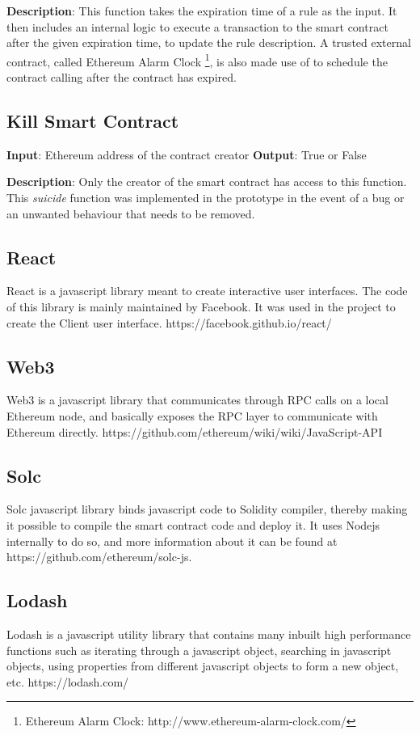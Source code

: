 \documentclass[english]{tktltiki}
\begin{document}
\textbf{Description}: This function takes the expiration time of a rule as the input. It then includes an internal logic to execute a transaction to the smart contract after the given expiration time, to update the rule description. A trusted external contract, called Ethereum Alarm Clock \footnote{Ethereum Alarm Clock: http://www.ethereum-alarm-clock.com/},  is also made use of to schedule the contract calling after the contract has expired.

\subsection*{Kill Smart Contract}
\textbf{Input}: Ethereum address of the contract creator\newline
\textbf{Output}: True or False\newline

\textbf{Description}: Only the creator of the smart contract has access to this function. This \textit{suicide} function was implemented in the prototype in the event of a bug or an unwanted behaviour that needs to be removed. 

\newpage
{}
\subsection*{React}
React is a javascript library meant to create interactive user interfaces. The code of this library is mainly maintained by Facebook. It was used in the project to create the Client user interface. https://facebook.github.io/react/ 
\subsection*{Web3}
Web3 is a javascript library that communicates through RPC calls on a local Ethereum node, and basically exposes the RPC layer to communicate with Ethereum directly. https://github.com/ethereum/wiki/wiki/JavaScript-API 
\subsection*{Solc}
Solc javascript library binds javascript code to Solidity compiler, thereby making it possible to compile the smart contract code and deploy it. It uses Nodejs internally to do so, and more information about it can be found at https://github.com/ethereum/solc-js.
\subsection*{Lodash}
Lodash is a javascript utility library that contains many inbuilt high performance functions such as iterating through a javascript object, searching in javascript objects, using properties from different javascript objects to form a new object, etc. https://lodash.com/
\end{document}
